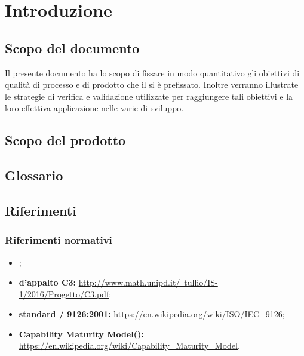 \newpage

\section{Introduzione}
	\subsection{Scopo del documento}
	Il presente documento ha lo scopo di fissare in modo quantitativo gli obiettivi di qualità di processo e di prodotto che il  si è prefissato. Inoltre verranno illustrate le strategie di verifica e validazione utilizzate per raggiungere tali obiettivi e la loro effettiva applicazione nelle varie  di sviluppo.
	\subsection{Scopo del prodotto}
	\introScopo
	\subsection{Glossario}
	\introGlossario
	\subsection{Riferimenti}
	\subsubsection{Riferimenti normativi}
	\begin{itemize}
		\item \ndpv;
		\item \textbf{ d'appalto C3:} \href{http://www.math.unipd.it/~tullio/IS-1/2016/Progetto/C3.pdf}{http://www.math.unipd.it/~tullio/IS-1/2016/Progetto/C3.pdf};
		\item \textbf{standard / 9126:2001:} \href{https://en.wikipedia.org/wiki/ISO/IEC\_9126}{https://en.wikipedia.org/wiki/ISO/IEC\_9126};
		\item \textbf{Capability Maturity Model():}
		\href{https://en.wikipedia.org/wiki/Capability\_Maturity\_Model}{https://en.wikipedia.org/wiki/Capability\_Maturity\_Model}.
		
	\end{itemize}
